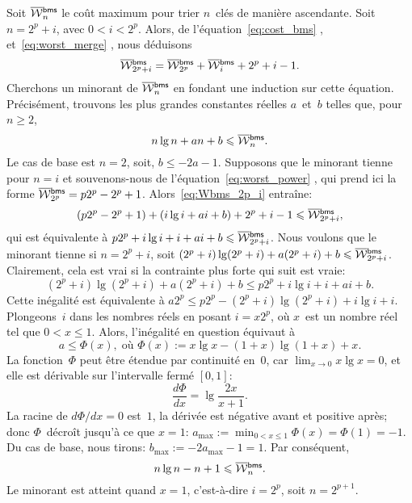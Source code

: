 
Soit \(\OW{\fun{bms}}{n}\) le coût
maximum pour trier \(n\)~clés de manière ascendante. Soit \(n=2^p+i\),
avec \(0 < i < 2^p\). Alors, de l'équation~\eqref{eq:cost_bms}
, et~\eqref{eq:worst_merge}
, nous déduisons
\begin{equation}
\OW{\fun{bms}}{2^p+i} = \OW{\fun{bms}}{2^p} + \OW{\fun{bms}}{i} + 2^p
+ i - 1.
\label{eq:Wbms_2p_i}
\end{equation}
Cherchons un minorant de \(\OW{\fun{bms}}{n}\) en fondant une
induction sur cette équation. Précisément, trouvons les plus grandes
constantes réelles \(a\)~et~\(b\) telles que, pour \(n \geqslant 2\),
\begin{equation*}
n\lg n + an + b \leqslant \OW{\fun{bms}}{n}.
\end{equation*}
Le cas de base est \(n=2\), soit, \(b \leqslant -2a - 1\). Supposons
que le minorant tienne pour \(n=i\) et souvenons-nous de
l'équation~\eqref{eq:worst_power} , qui prend
ici la forme \(\OW{\fun{bms}}{2^p} = p2^p - 2^p +
1\). Alors~\eqref{eq:Wbms_2p_i} entraîne:
\begin{equation*}
(p2^p - 2^p + 1) + (i\lg i + ai + b) + 2^p + i - 1 \leqslant
\OW{\fun{bms}}{2^p+i},
\end{equation*}
qui est équivalente à \(p2^p + i\lg i + i + ai + b \leqslant
\OW{\fun{bms}}{2^p+i}\). Nous voulons que le minorant tienne si
\(n=2^p+i\), soit \((2^p+i)\lg(2^p+i) + a(2^p+i) + b \leqslant
\OW{\fun{bms}}{2^p+i}\). Clairement, cela est vrai si la contrainte
plus forte qui suit est vraie:
\begin{equation*}
(2^p+i)\lg(2^p+i) + a(2^p+i) + b \leqslant p2^p + i\lg i + i + ai + b.
\end{equation*}
Cette inégalité est équivalente à \(a2^p \leqslant p2^p -
(2^p+i)\lg(2^p+i) + i\lg i + i\). Plongeons~\(i\) dans les nombres
réels en posant \(i=x2^p\), où \(x\)~est un nombre réel tel que \(0 <
x \leqslant 1\). Alors, l'inégalité en question équivaut à
\begin{equation*}
a \leqslant \Phi(x),\; \text{où \(\Phi(x) := x\lg x -
  (1+x)\lg(1+x) + x\).}
\end{equation*}
La fonction~\(\Phi\) peut être étendue par continuité en~\(0\), car
\(\lim_{x \to 0} x\lg x = 0\), et elle est dérivable sur l'intervalle
fermé \([0,1]\):
\begin{equation*}
\frac{d\Phi}{dx} = \lg\frac{2x}{x+1}.
\end{equation*}
La racine de \(d\Phi/dx = 0\) est~\(1\), la dérivée est négative avant
et positive après; donc \(\Phi\)~décroît jusqu'à ce que \(x=1\):
\(a_{\max} := \min_{0 < x \leqslant 1}\Phi(x) = \Phi(1) =
-1\). Du cas de base, nous tirons: \(b_{\max} := -2a_{\max} - 1 =
1\). Par conséquent,
\begin{equation*}
n\lg n - n + 1 \leqslant \OW{\fun{bms}}{n}.
\end{equation*}
Le minorant est atteint quand \(x=1\), c'est-à-dire \(i=2^p\), soit
\(n=2^{p+1}\).

